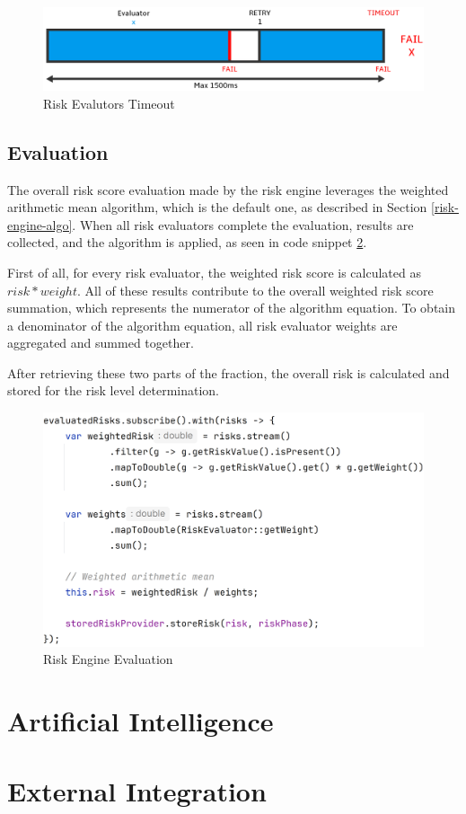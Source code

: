 \begin{figure}[htbp]
  \centering
  \includegraphics[width=1\textwidth]{img/sections/6-implementation/async-timeout.png}
  \caption{Risk Evalutors Timeout}
  \label{fig:impl-risk-engine-timeout}
\end{figure}

\newpage

\subsection{Evaluation} \label{impl-engine-evaluation}
The overall risk score evaluation made by the risk engine leverages the weighted arithmetic mean algorithm, which is the default one, as described in Section \ref{risk-engine-algo}.
When all risk evaluators complete the evaluation, results are collected, and the algorithm is applied, as seen in code snippet \ref{fig:impl-risk-engine-evaluation}.

First of all, for every risk evaluator, the weighted risk score is calculated as \( risk * weight \).
All of these results contribute to the overall weighted risk score summation, which represents the numerator of the algorithm equation.
To obtain a denominator of the algorithm equation, all risk evaluator weights are aggregated and summed together.

After retrieving these two parts of the fraction, the overall risk is calculated and stored for the risk level determination. 

\begin{figure}[htbp]
  \centering
  \includegraphics[width=1\textwidth]{img/sections/6-implementation/risk-engine-evaluation.png}
  \caption{Risk Engine Evaluation}
  \label{fig:impl-risk-engine-evaluation}
\end{figure}

\newpage
\section{Artificial Intelligence}

\newpage
\section{External Integration}

\shorthandoff{-}